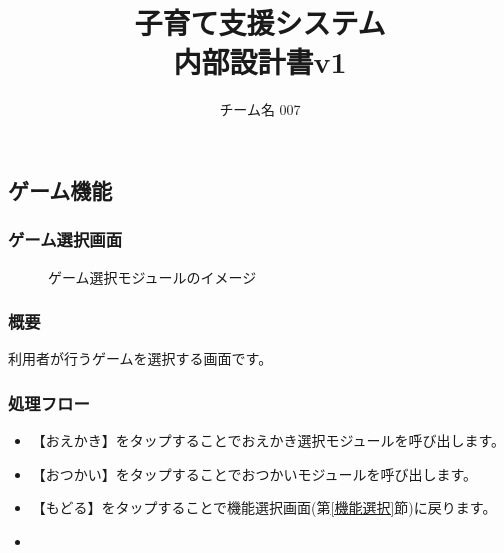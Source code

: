 \documentclass[a4j]{jarticle}
\title{
\vspace{30mm}
{\bf 子育て支援システム}
\\
\vspace{5mm}
{\bf 内部設計書v1\\
}
\vspace{120mm}
}
\author{
\vspace{5mm}
チーム名 007\\
\vspace{5mm}
}
\begin{document}
\maketitle
\tableofcontents
\newpage


\subsection{ゲーム機能}
\subsubsection{ゲーム選択画面\label{ゲーム選択}}
\begin{figure}[H]
    \begin{center}
    \caption {ゲーム選択モジュールのイメージ}
    \label{functionselection}
    \end{center}
\end{figure}

\subsubsection*{概要}
 利用者が行うゲームを選択する画面です。

\subsubsection*{処理フロー}
\begin{itemize}
\item 【おえかき】をタップすることでおえかき選択モジュールを呼び出します。
\item 【おつかい】をタップすることでおつかいモジュールを呼び出します。
\item 【もどる】をタップすることで機能選択画面(第\ref{機能選択}節)に戻ります。
\item
\end{itemize}
\end{document}
